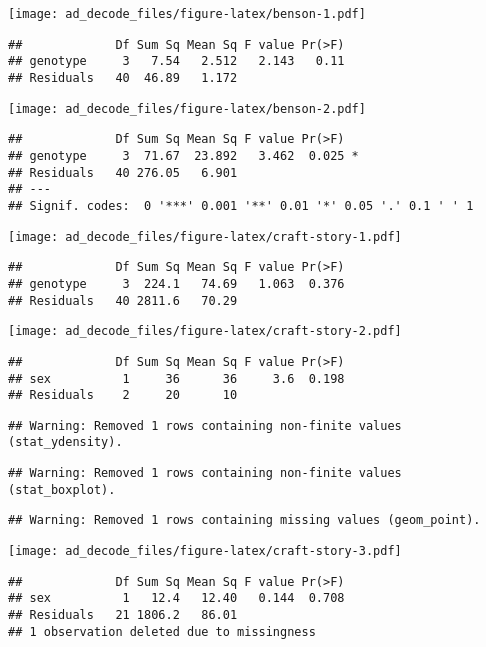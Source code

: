 \documentclass[
]{article}
\begin{document}
\texttt{[image: ad\_decode\_files/figure-latex/benson-1.pdf]}

\begin{verbatim}
##             Df Sum Sq Mean Sq F value Pr(>F)
## genotype     3   7.54   2.512   2.143   0.11
## Residuals   40  46.89   1.172
\end{verbatim}

\texttt{[image: ad\_decode\_files/figure-latex/benson-2.pdf]}

\begin{verbatim}
##             Df Sum Sq Mean Sq F value Pr(>F)  
## genotype     3  71.67  23.892   3.462  0.025 *
## Residuals   40 276.05   6.901                 
## ---
## Signif. codes:  0 '***' 0.001 '**' 0.01 '*' 0.05 '.' 0.1 ' ' 1
\end{verbatim}

\texttt{[image: ad\_decode\_files/figure-latex/craft-story-1.pdf]}

\begin{verbatim}
##             Df Sum Sq Mean Sq F value Pr(>F)
## genotype     3  224.1   74.69   1.063  0.376
## Residuals   40 2811.6   70.29
\end{verbatim}

\texttt{[image: ad\_decode\_files/figure-latex/craft-story-2.pdf]}

\begin{verbatim}
##             Df Sum Sq Mean Sq F value Pr(>F)
## sex          1     36      36     3.6  0.198
## Residuals    2     20      10
\end{verbatim}

\begin{verbatim}
## Warning: Removed 1 rows containing non-finite values (stat_ydensity).
\end{verbatim}

\begin{verbatim}
## Warning: Removed 1 rows containing non-finite values (stat_boxplot).
\end{verbatim}

\begin{verbatim}
## Warning: Removed 1 rows containing missing values (geom_point).
\end{verbatim}

\texttt{[image: ad\_decode\_files/figure-latex/craft-story-3.pdf]}

\begin{verbatim}
##             Df Sum Sq Mean Sq F value Pr(>F)
## sex          1   12.4   12.40   0.144  0.708
## Residuals   21 1806.2   86.01               
## 1 observation deleted due to missingness
\end{verbatim}
\end{document}
